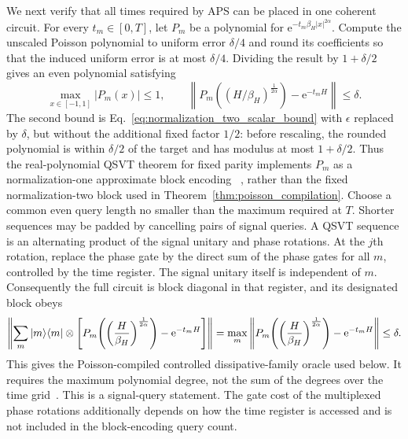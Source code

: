 \documentclass[aps,pra,reprint,floatfix,unsortedaddress,superscriptaddress]{revtex4-2}
\newcommand{\abs}[1]{\left\lvert#1\right\rvert}
\begin{document}
We next verify that all times required by APS can be placed in one
coherent circuit.  For every $t_m\in[0,T]$, let $P_m$ be a polynomial
for $\mathrm e^{-t_m\beta_H\abs{x}^{2\alpha}}$.  Compute the unscaled
Poisson polynomial to uniform error $\delta/4$ and round its coefficients
so that the induced uniform error is at most $\delta/4$.  Dividing the
result by $1+\delta/2$ gives an even polynomial satisfying
\begin{equation}
    \max_{x\in[-1,1]}\abs{P_m(x)}\leq1,
    \qquad
    \left\|
    P_m\!\left((H/\beta_H)^{\frac{1}{2\alpha}}\right)
    -\mathrm e^{-t_mH}
    \right\|\leq\delta.
    \label{eq:aps_normalization_one_family}
\end{equation}
The second bound is Eq.~\eqref{eq:normalization_two_scalar_bound} with
$\epsilon$ replaced by $\delta$, but without the additional fixed factor
$1/2$: before rescaling, the rounded polynomial is within $\delta/2$ of
the target and has modulus at most $1+\delta/2$.
Thus the real-polynomial QSVT theorem for fixed parity implements $P_m$
as a normalization-one approximate block encoding
~\cite{Gilyen2019qsvt}, rather than the fixed normalization-two block
used in Theorem~\ref{thm:poisson_compilation}.  Choose a common even
query length no smaller than the maximum required at $T$.  Shorter
sequences may be padded by cancelling pairs of signal queries.  A QSVT
sequence is an
alternating product of the signal unitary and phase rotations.  At the
$j$th rotation, replace the phase gate by the direct sum of the phase
gates for all $m$, controlled by the time register.  The signal unitary
itself is independent of $m$.
Consequently the full circuit is block diagonal in that register, and
its designated block obeys
\begin{align}
\left\|
\sum_m\ket m\!\bra m\otimes
\left[
P_m\!\left(
\left(\frac{H}{\beta_H}\right)^{\frac{1}{2\alpha}}
\right)
-\mathrm e^{-t_mH}
\right]
\right\|
=\max_m\left\|
P_m\!\left(
\left(\frac{H}{\beta_H}\right)^{\frac{1}{2\alpha}}
\right)
-\mathrm e^{-t_mH}
\right\|
\leq\delta.
\label{eq:aps_controlled_family_error}
\end{align}
This gives the Poisson-compiled controlled dissipative-family oracle
used below.  It requires the maximum polynomial degree,
not the sum of the degrees over the time grid~\cite{Gilyen2019qsvt}.
This is a signal-query statement.  The gate cost of the multiplexed
phase rotations additionally depends on how the time register is
accessed and is not included in the block-encoding query count.
\end{document}
